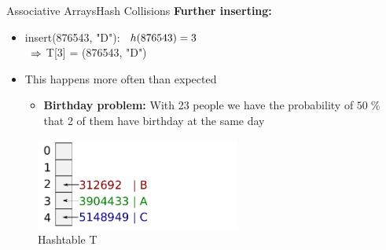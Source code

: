 \begin{frame}{Associative Arrays}{Hash Collisions}
  \textbf{Further inserting:}
  \begin{itemize}
    \item<1->
      insert(876543, "D"):
      $\hspace*{0.5em} h(876543) = 3$\\
      $\hspace*{0.5em} \Rightarrow$
      T[3] = (876543, "D") {\color{red}{COLLISION!}}
    \item<3->
      This happens more often than expected
      \begin{itemize}
        \item
          \textbf{Birthday problem:}
          With 23 people we have the probability of $50\;\%$ that 2 of
          them have birthday at the same day
      \end{itemize}
  \end{itemize}
  \vspace*{-1.0em}
  \begin{figure}
    \caption{Hashtable T}
    \centering
       \includegraphics[width=0.6\textwidth]{Images/Bucket4.pdf}
  \end{figure}
\end{frame}


